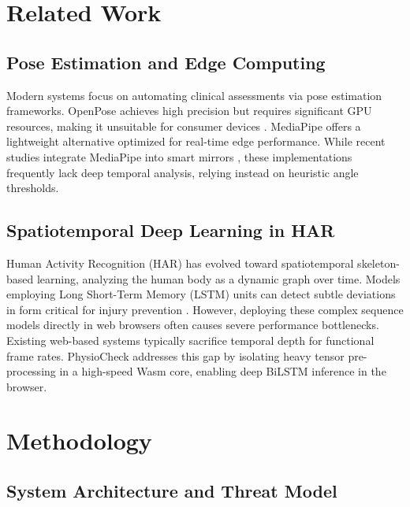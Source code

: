 \documentclass[conference]{IEEEtran}
\begin{document}
\section{Related Work}

\subsection{Pose Estimation and Edge Computing}
Modern systems focus on automating clinical assessments via pose estimation frameworks. OpenPose achieves high precision but requires significant GPU resources, making it unsuitable for consumer devices \cite{kandala_2024}. MediaPipe offers a lightweight alternative optimized for real-time edge performance. While recent studies integrate MediaPipe into smart mirrors \cite{sharma_2025}, these implementations frequently lack deep temporal analysis, relying instead on heuristic angle thresholds. 

\subsection{Spatiotemporal Deep Learning in HAR}
Human Activity Recognition (HAR) has evolved toward spatiotemporal skeleton-based learning, analyzing the human body as a dynamic graph over time. Models employing Long Short-Term Memory (LSTM) units can detect subtle deviations in form critical for injury prevention \cite{wang_2026}. However, deploying these complex sequence models directly in web browsers often causes severe performance bottlenecks. Existing web-based systems typically sacrifice temporal depth for functional frame rates. PhysioCheck addresses this gap by isolating heavy tensor pre-processing in a high-speed Wasm core, enabling deep BiLSTM inference in the browser.

\section{Methodology}

\subsection{System Architecture and Threat Model}
\end{document}
